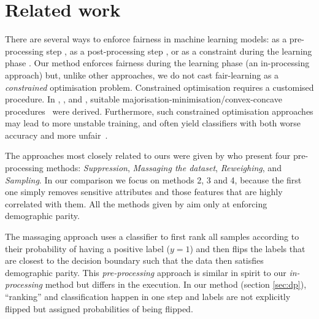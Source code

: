 \section{Related work}\label{sec:relatedwork}
There are several ways to enforce fairness in machine learning models:
as a pre-processing step
\citep{kamiran2012data,louizos2016variational,lum2016statistical,zemel2013learning,chiappa2019path,QuaShaTho19},
as a post-processing step \citep{feldman2015certifying,hardt2016equality}, %
 or as a constraint during the learning phase
\citep{calders2009building,zafar2017fairnesstreatment,zafar2017fairnessconstraints,DonOneBenShaetal18,DimLiuParRad19}.
%
Our method enforces fairness during the learning phase (an in-processing approach) but, unlike other approaches, we do not cast fair-learning as a \emph{constrained} optimisation problem.
Constrained optimisation requires a customised procedure.
%
In \citet{GohCotGupFri16}, \citet{zafar2017fairnessconstraints}, and \citet{zafar2017fairnesstreatment},
suitable majorisation-minimisation/convex-concave procedures~\citep{LanSri09} were derived.
%
Furthermore, such constrained optimisation approaches may lead to more unstable training,
and often yield classifiers with both worse accuracy and more unfair~\citep{CotJiaWanNar18}.

The approaches most closely related to ours were given by \citet{kamiran2012data} who present four pre-processing methods:
\emph{Suppression}, \emph{Massaging the dataset}, \emph{Reweighing}, and \emph{Sampling}.
In our comparison we focus on methods 2, 3 and 4,
because the first one simply removes sensitive attributes and those features that are highly correlated with them.
All the methods given by \citet{kamiran2012data} aim only at enforcing demographic parity.

The massaging approach uses a classifier to first rank all samples according to their probability of having a positive label ($y=1$)
and then flips the labels that are closest to the decision boundary such that the data then satisfies demographic parity.
This \emph{pre-processing} approach is similar in spirit to our \emph{in-processing} method but differs in the execution.
In our method (section \ref{sec:dp}), ``ranking'' and classification happen in one step and labels are not explicitly flipped
but assigned probabilities of being flipped.

